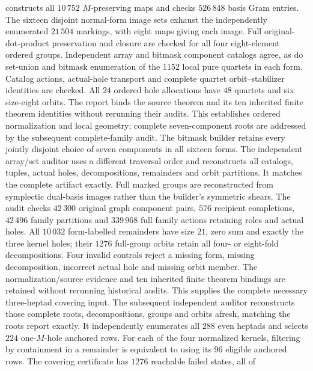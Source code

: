 constructs all $10\,752$ $M$-preserving maps and checks $526\,848$
basis Gram entries. The sixteen disjoint normal-form image sets
exhaust the independently enumerated $21\,504$ markings, with
eight maps giving each image. Full original-dot-product preservation
and closure are checked for all four eight-element ordered groups.
Independent array and bitmask component catalogs agree, as do
set-union and bitmask enumeration of the $1152$ local pure quartets
in each form. Catalog actions, actual-hole transport and complete
quartet orbit--stabilizer identities are checked. All $24$ ordered
hole allocations have $48$ quartets and six size-eight orbits.
The report binds the source theorem and its ten inherited finite
theorem identities without rerunning their audits. This establishes
ordered normalization and local geometry; complete seven-component
roots are addressed by the subsequent complete-family audit.
The bitmask builder
retains every jointly disjoint choice of seven components in all
sixteen forms. The independent array/set auditor
uses a different traversal order and reconstructs all catalogs,
tuples, actual holes, decompositions, remainders and orbit partitions.
It matches the complete artifact exactly. Full marked groups are
reconstructed from symplectic dual-basis images rather than the
builder's symmetric shears. The audit checks $42\,300$ original
graph component pairs, $576$ recipient completions, $42\,496$
family partitions and $339\,968$ full family actions retaining
roles and actual holes. All $10\,032$ form-labelled remainders
have size $21$, zero sum and exactly the three kernel holes;
their $1276$ full-group orbits retain all four- or eight-fold
decompositions. Four invalid controls reject a missing form,
missing decomposition, incorrect actual hole and missing orbit member.
The normalization/source evidence and ten inherited finite theorem
bindings are retained without rerunning historical audits.
This supplies the complete necessary three-heptad covering input.
The subsequent independent auditor
reconstructs those complete roots, decompositions, groups and orbits
afresh, matching the roots report exactly. It independently enumerates
all $288$ even heptads and selects $224$ one-$M$-hole anchored rows.
For each of the four normalized kernels, filtering by containment
in a remainder is equivalent to using its $96$ eligible anchored rows.
The covering certificate has $1276$ reachable failed states, all of
